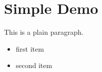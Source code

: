 \documentclass{article}
\begin{document}
\section{ Simple Demo}

This is a plain paragraph.

\begin{itemize}
\item  first item
\item  second item
\end{itemize}
\end{document}
